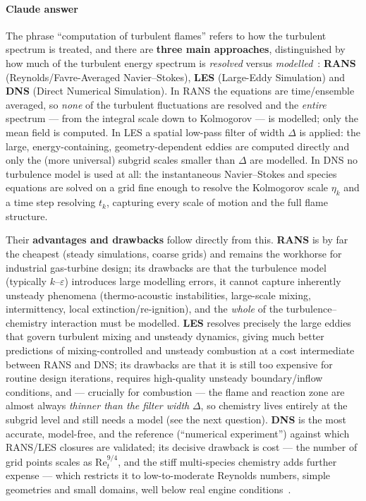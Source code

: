 {\color{istblue}
\paragraph{Claude answer}
The phrase ``computation of turbulent flames'' refers to how the turbulent spectrum is treated, and there are \textbf{three main approaches}, distinguished by how much of the turbulent energy spectrum is \emph{resolved} versus \emph{modelled}~\cite{lecture10,veynante2002turbulent,poinsot2012theoretical}: \textbf{RANS} (Reynolds/Favre-Averaged Navier--Stokes), \textbf{LES} (Large-Eddy Simulation) and \textbf{DNS} (Direct Numerical Simulation). In RANS the equations are time/ensemble averaged, so \emph{none} of the turbulent fluctuations are resolved and the \emph{entire} spectrum --- from the integral scale down to Kolmogorov --- is modelled; only the mean field is computed. In LES a spatial low-pass filter of width $\Delta$ is applied: the large, energy-containing, geometry-dependent eddies are computed directly and only the (more universal) subgrid scales smaller than $\Delta$ are modelled. In DNS no turbulence model is used at all: the instantaneous Navier--Stokes and species equations are solved on a grid fine enough to resolve the Kolmogorov scale $\eta_k$ and a time step resolving $t_k$, capturing every scale of motion and the full flame structure.

Their \textbf{advantages and drawbacks} follow directly from this. \textbf{RANS} is by far the cheapest (steady simulations, coarse grids) and remains the workhorse for industrial gas-turbine design; its drawbacks are that the turbulence model (typically $k$--$\varepsilon$) introduces large modelling errors, it cannot capture inherently unsteady phenomena (thermo-acoustic instabilities, large-scale mixing, intermittency, local extinction/re-ignition), and the \emph{whole} of the turbulence--chemistry interaction must be modelled. \textbf{LES} resolves precisely the large eddies that govern turbulent mixing and unsteady dynamics, giving much better predictions of mixing-controlled and unsteady combustion at a cost intermediate between RANS and DNS; its drawbacks are that it is still too expensive for routine design iterations, requires high-quality unsteady boundary/inflow conditions, and --- crucially for combustion --- the flame and reaction zone are almost always \emph{thinner than the filter width} $\Delta$, so chemistry lives entirely at the subgrid level and still needs a model (see the next question). \textbf{DNS} is the most accurate, model-free, and the reference (``numerical experiment'') against which RANS/LES closures are validated; its decisive drawback is cost --- the number of grid points scales as $\mathrm{Re}_t^{9/4}$, and the stiff multi-species chemistry adds further expense --- which restricts it to low-to-moderate Reynolds numbers, simple geometries and small domains, well below real engine conditions~\cite{pope2000turbulent,veynante2002turbulent}.

}
